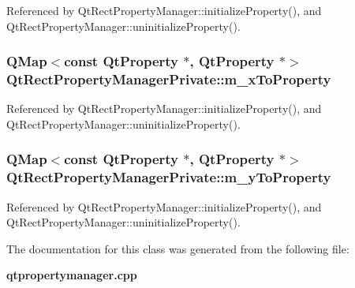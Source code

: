 Referenced by Qt\+Rect\+Property\+Manager\+::initialize\+Property(), and Qt\+Rect\+Property\+Manager\+::uninitialize\+Property().

\subsubsection[{m\+\_\+x\+To\+Property}]{\setlength{\rightskip}{0pt plus 5cm}Q\+Map$<$const {\bf Qt\+Property} $\ast$, {\bf Qt\+Property} $\ast$$>$ Qt\+Rect\+Property\+Manager\+Private\+::m\+\_\+x\+To\+Property}\label{classQtRectPropertyManagerPrivate_a830135dc8b3ccf8d7c5d4e41ead3fe8b}


Referenced by Qt\+Rect\+Property\+Manager\+::initialize\+Property(), and Qt\+Rect\+Property\+Manager\+::uninitialize\+Property().

\subsubsection[{m\+\_\+y\+To\+Property}]{\setlength{\rightskip}{0pt plus 5cm}Q\+Map$<$const {\bf Qt\+Property} $\ast$, {\bf Qt\+Property} $\ast$$>$ Qt\+Rect\+Property\+Manager\+Private\+::m\+\_\+y\+To\+Property}\label{classQtRectPropertyManagerPrivate_ad26e7b19aa818c93e8a1c6dcfab00ff8}


Referenced by Qt\+Rect\+Property\+Manager\+::initialize\+Property(), and Qt\+Rect\+Property\+Manager\+::uninitialize\+Property().



The documentation for this class was generated from the following file\+:\begin{DoxyCompactItemize}
\item 
{\bf qtpropertymanager.\+cpp}\end{DoxyCompactItemize}
